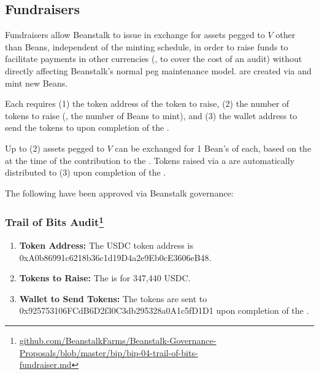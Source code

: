 \documentclass[class=article, crop=false]{standalone}
\begin{document}
\subsection{Fundraisers}
Fundraisers allow Beanstalk to issue  in exchange for assets pegged to $V$ other than Beans, independent of the  minting schedule, in order to raise funds to facilitate payments in other currencies (, to cover the cost of an audit) without directly affecting Beanstalk's normal peg maintenance model.  are created via  and mint new Beans. 

Each  requires (1) the token address of the token to raise, (2) the number of tokens to raise (, the number of Beans to mint), and (3) the wallet address to send the tokens to upon completion of the . 

Up to (2) assets pegged to $V$ can be exchanged for 1  Bean's  of  each, based on the  at the time of the contribution to the . Tokens raised via a  are automatically distributed to (3) upon completion of the .

The following  have been approved via Beanstalk governance:

\subsubsection[Trail of Bits Audit]{Trail of Bits Audit\protect \footnote{\href{https://github.com/BeanstalkFarms/Beanstalk-Governance-Proposals/blob/master/bip/bip-04-trail-of-bits-fundraiser.md}{github.com/BeanstalkFarms/Beanstalk-Governance-Proposals/blob/master/bip/bip-04-trail-of-bits-\\fundraiser.md}}}
    \begin{enumerate}
        \item \textbf{Token Address:} The USDC token address is 0xA0b86991c6218b36c1d19D4a2e9Eb0cE3606eB48.
        \item \textbf{Tokens to Raise:} The  is for 347,440 USDC.
        \item \textbf{Wallet to Send Tokens:} The tokens are sent to 0x925753106FCdB6D2f30C3db295328a0A1c5fD1D1 upon completion of the .
    \end{enumerate}
\end{document}
